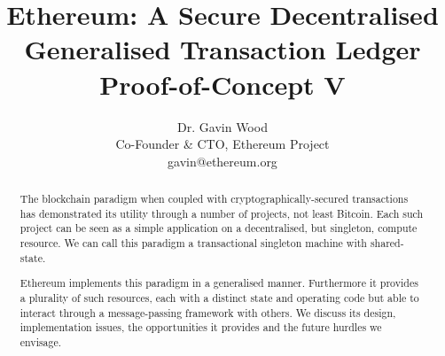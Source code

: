\documentclass[9pt,oneside]{amsart}
\title{Ethereum: A Secure Decentralised Generalised Transaction Ledger \\ {\smaller \textbf{Proof-of-Concept V}}}
\author{
    Dr. Gavin Wood\\
    Co-Founder \& CTO, Ethereum Project\\
    gavin@ethereum.org
}
\begin{document}
\pagecolor{lightyellow}

\begin{abstract}
The blockchain paradigm when coupled with cryptographically-secured transactions has demonstrated its utility through a number of projects, not least Bitcoin. Each such project can be seen as a simple application on a decentralised, but singleton, compute resource. We can call this paradigm a transactional singleton machine with shared-state.

Ethereum implements this paradigm in a generalised manner. Furthermore it provides a plurality of such resources, each with a distinct state and operating code but able to interact through a message-passing framework with others. We discuss its design, implementation issues, the opportunities it provides and the future hurdles we envisage.
\end{abstract}

\maketitle
\end{document}

